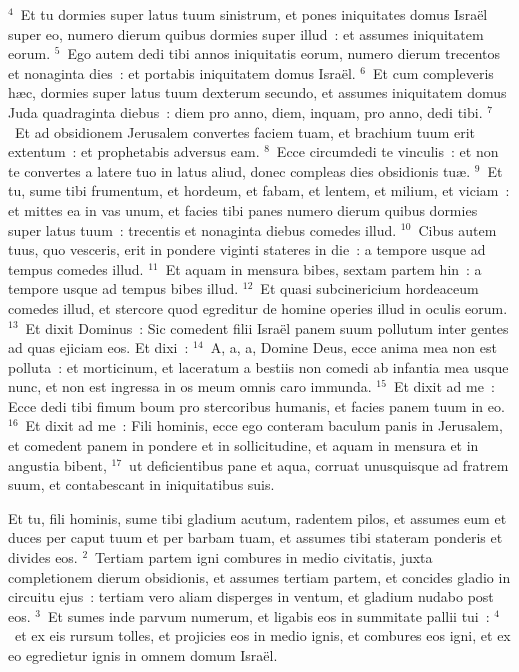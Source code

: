 ${}^{4}$~Et tu dormies super latus tuum sinistrum, et pones iniquitates domus Isra\"el super eo, numero dierum quibus dormies super illud~: et assumes iniquitatem eorum.
${}^{5}$~Ego autem dedi tibi annos iniquitatis eorum, numero dierum trecentos et nonaginta dies~: et portabis iniquitatem domus Isra\"el.
${}^{6}$~Et cum compleveris h\ae c, dormies super latus tuum dexterum secundo, et assumes iniquitatem domus Juda quadraginta diebus~: diem pro anno, diem, inquam, pro anno, dedi tibi.
${}^{7}$~Et ad obsidionem Jerusalem convertes faciem tuam, et brachium tuum erit extentum~: et prophetabis adversus eam.
${}^{8}$~Ecce circumdedi te vinculis~: et non te convertes a latere tuo in latus aliud, donec compleas dies obsidionis tu\ae .
${}^{9}$~Et tu, sume tibi frumentum, et hordeum, et fabam, et lentem, et milium, et viciam~: et mittes ea in vas unum, et facies tibi panes numero dierum quibus dormies super latus tuum~: trecentis et nonaginta diebus comedes illud.
${}^{10}$~Cibus autem tuus, quo vesceris, erit in pondere viginti stateres in die~: a tempore usque ad tempus comedes illud.
${}^{11}$~Et aquam in mensura bibes, sextam partem hin~: a tempore usque ad tempus bibes illud.
${}^{12}$~Et quasi subcinericium hordeaceum comedes illud, et stercore quod egreditur de homine operies illud in oculis eorum.
${}^{13}$~Et dixit Dominus~: Sic comedent filii Isra\"el panem suum pollutum inter gentes ad quas ejiciam eos. Et dixi~:
${}^{14}$~A, a, a, Domine Deus, ecce anima mea non est polluta~: et morticinum, et laceratum a bestiis non comedi ab infantia mea usque nunc, et non est ingressa in os meum omnis caro immunda.
${}^{15}$~Et dixit ad me~: Ecce dedi tibi fimum boum pro stercoribus humanis, et facies panem tuum in eo.
${}^{16}$~Et dixit ad me~: Fili hominis, ecce ego conteram baculum panis in Jerusalem, et comedent panem in pondere et in sollicitudine, et aquam in mensura et in angustia bibent,
${}^{17}$~ut deficientibus pane et aqua, corruat unusquisque ad fratrem suum, et contabescant in iniquitatibus suis.

\bchapter
\lettrine[lines=3,image=true,loversize=0.05,lraise=-0.03]{E}{}t tu, fili hominis, sume tibi gladium acutum, radentem pilos, et assumes eum et duces per caput tuum et per barbam tuam, et assumes tibi stateram ponderis et divides eos.
${}^{2}$~Tertiam partem igni combures in medio civitatis, juxta completionem dierum obsidionis, et assumes tertiam partem, et concides gladio in circuitu ejus~: tertiam vero aliam disperges in ventum, et gladium nudabo post eos.
${}^{3}$~Et sumes inde parvum numerum, et ligabis eos in summitate pallii tui~:
${}^{4}$~et ex eis rursum tolles, et projicies eos in medio ignis, et combures eos igni, et ex eo egredietur ignis in omnem domum Isra\"el.


